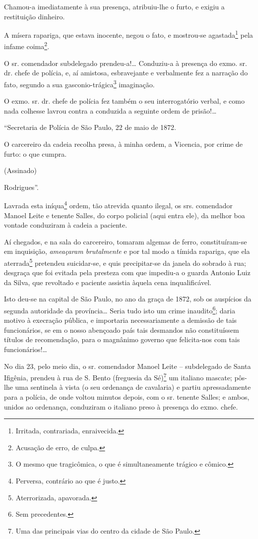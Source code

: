 Chamou-a imediatamente à sua presença, atribuiu-lhe o furto, e exigiu a
restituição dinheiro.

A mísera rapariga, que estava inocente, negou o fato, e mostrou-se
agastada\footnote{ Irritada, contrariada, enraivecida.} pela infame
coima\footnote{ Acusação de erro, de culpa.}.

O sr. comendador subdelegado prendeu-a!\ldots{} Conduziu-a à presença do
exmo. sr. dr. chefe de polícia, e, aí amistosa, esbravejante e
verbalmente fez a narração do fato, segundo a sua
gasconio-trágica\footnote{ O mesmo que tragicômica, o que é
  simultaneamente trágico e cômico.} imaginação.

O exmo. sr. dr. chefe de polícia fez também o seu interrogatório verbal,
e como nada colhesse lavrou contra a conduzida a seguinte ordem de
prisão!\ldots{}

``Secretaria de Polícia de São Paulo, 22 de maio de 1872.

O carcereiro da cadeia recolha presa, à minha ordem, a Vicencia, por
crime de furto: o que cumpra.

(Assinado)

Rodrigues''.

Lavrada esta iníqua\footnote{ Perversa, contrário ao que é justo.}
ordem, tão atrevida quanto ilegal, os srs. comendador Manoel Leite e
tenente Salles, do corpo policial (aqui entra ele), da melhor boa
vontade conduziram à cadeia a paciente.

Aí chegados, e na sala do carcereiro, tomaram algemas de ferro,
constituíram-se em inquisição, \emph{ameaçaram brutalmente} e por tal
modo a tímida rapariga, que ela aterrada\footnote{ Aterrorizada,
  apavorada.} pretendeu suicidar-se, e quis precipitar-se da janela do
sobrado à rua; desgraça que foi evitada pela presteza com que impediu-a
o guarda Antonio Luiz da Silva, que revoltado e paciente assistia àquela
cena inqualificável.

Isto deu-se na capital de São Paulo, no ano da graça de 1872, sob os
auspícios da segunda autoridade da província\ldots{} Seria tudo isto um crime
inaudito\footnote{ Sem precedentes.}; daria motivo à execração pública,
e importaria necessariamente a demissão de tais funcionários, se em o
nosso abençoado país tais desmandos não constituíssem títulos de
recomendação, para o magnânimo governo que felicita-nos com tais
funcionários!\ldots{}

No dia 23, pelo meio dia, o sr. comendador Manoel Leite -- subdelegado
de Santa Ifigênia, prendeu à rua de S. Bento (freguesia da
Sé)\footnote{ Uma das principais vias do centro da cidade de São Paulo.}
um italiano mascate; pôs-lhe uma sentinela à vista (o seu ordenança de
cavalaria) e partiu apressadamente para a polícia, de onde voltou
minutos depois, com o sr. tenente Salles; e ambos, unidos ao ordenança,
conduziram o italiano preso à presença do exmo. chefe.

